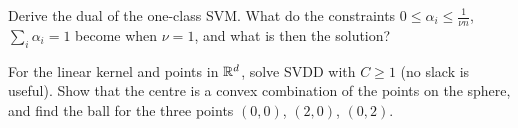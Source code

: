 \begin{notechapter}
\begin{exercise}\label{support-vector-methods:exr:2}
Derive the dual of the one-class SVM. What do the constraints $0\leq\alpha_i\leq\frac1{\nu n}$, $\sum_i\alpha_i = 1$ become
when $\nu = 1$, and what is then the solution?
\end{exercise}

\begin{exercise}\label{support-vector-methods:exr:3}
For the linear kernel and points in $\mathbb{R}^d$, solve SVDD with $C\geq1$ (no slack is useful). Show
that the centre is a convex combination of the points on the sphere, and find the ball for
the three points $(0,0)$, $(2,0)$, $(0,2)$.
\end{exercise}
\end{notechapter}
